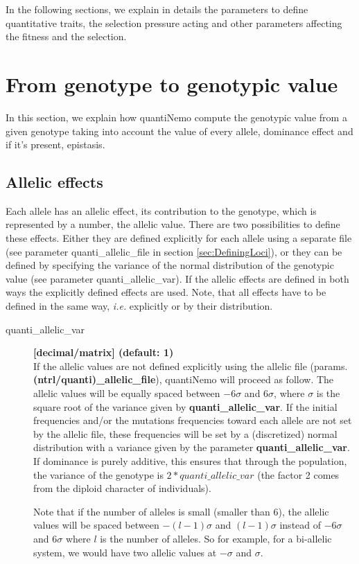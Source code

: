 \documentclass[letterpaper,12pt,oneside]{book}
\begin{document}
In the following sections, we explain in details the parameters to define quantitative traits, the selection pressure acting and other parameters affecting the fitness and the selection. 

\section{From genotype to genotypic value }
In this section, we explain how quantiNemo compute the genotypic value from a given genotype taking into account the value of every allele, dominance effect and if it's present, epistasis. 
\subsection{Allelic effects}\label{sub:AllelicEffects}
Each allele has an allelic effect, its contribution to the genotype, which is represented by a number, the allelic value. There are two possibilities to define these effects. Either they are defined explicitly for each allele using a separate file (see parameter \textsf{quanti\_allelic\_file} in section \ref{sec:DefiningLoci}), or they can be defined by specifying the variance of the normal distribution of the genotypic value (see parameter \textsf{quanti\_allelic\_var}). If the allelic effects are defined in both ways the explicitly defined effects are used. Note, that all effects have to be defined in the same way, \textit{i.e.} explicitly or by their distribution.

\begin{description}

\item[quanti\_allelic\_var] \textbf{[decimal/matrix]  (default: 1)}\\

If the allelic values are not defined explicitly using the allelic file (params. \textbf{(ntrl/quanti)\_allelic\_file}), quantiNemo will proceed as follow. The allelic values will be equally spaced between $-6 \sigma$ and $6 \sigma$, where $\sigma$ is the square root of the variance given by \textbf{quanti\_allelic\_var}. If the initial frequencies and/or the mutations frequencies toward each allele are not set by the allelic file, these frequencies will be set by a (discretized) normal distribution with a variance given by the parameter \textbf{quanti\_allelic\_var}. If dominance is purely additive, this ensures that through the population, the variance of the genotype is $2*quanti\_allelic\_var$ (the factor 2 comes from the diploid character of individuals).

Note that if the number of alleles is small (smaller than 6), the allelic values will be spaced between $-(l-1)\sigma$ and $(l-1)\sigma$ instead of  $-6 \sigma$ and $6 \sigma$  where $l$ is the number of alleles. So for example, for a bi-allelic system, we would have two allelic values at $-\sigma$ and $\sigma$.
\end{description} 
\end{document}
